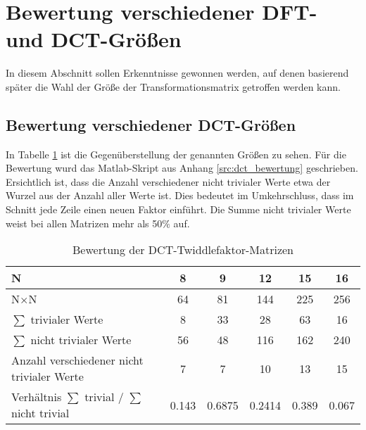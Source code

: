 \section{Bewertung verschiedener DFT- und DCT-Größen}
In diesem Abschnitt sollen Erkenntnisse gewonnen werden, auf denen basierend später die Wahl der Größe der Transformationsmatrix getroffen werden kann.
\subsection{Bewertung verschiedener DCT-Größen}
In Tabelle \ref{tab:DCT-TwiddlefaktorMatrizenBewertung} ist die Gegenüberstellung der genannten Größen zu sehen. Für die Bewertung wurd das 
Matlab-Skript aus Anhang \ref{src:dct_bewertung} geschrieben.
Ersichtlich ist, dass die Anzahl verschiedener nicht trivialer Werte etwa der Wurzel aus der Anzahl aller Werte ist.
Dies bedeutet im Umkehrschluss, dass im Schnitt jede Zeile einen neuen Faktor einführt. Die Summe nicht trivialer Werte weist bei allen Matrizen
mehr als 50$\%$ auf. 

\begingroup
  \renewcommand*{\arraystretch}{1.2} %
\begin{table}[ht!]
 \centering
 \caption{Bewertung der DCT-Twiddlefaktor-Matrizen}
 \begin{tabular}{lccccc}
   \hline  
   N                                                 & 8     & 9      & 12     & 15    & 16\\
   \hline
   N$\times$N                                        & 64    & 81     & 144    & 225   & 256\\
   \rowcolor{lightgray}
   $\sum$ trivialer Werte                            & 8     & 33     & 28     & 63    & 16\\
   \rowcolor{lightgray}
   $\sum$ nicht trivialer Werte                      & 56    & 48     & 116    & 162   & 240\\
   Anzahl verschiedener nicht trivialer Werte        & 7     & 7      & 10     & 13    & 15\\
   Verhältnis $\sum$ trivial / $\sum$ nicht trivial  & 0.143 & 0.6875 & 0.2414 & 0.389 & 0.067\\
   \hline
 \end{tabular}
 \label{tab:DCT-TwiddlefaktorMatrizenBewertung}  
\end{table}
\endgroup

